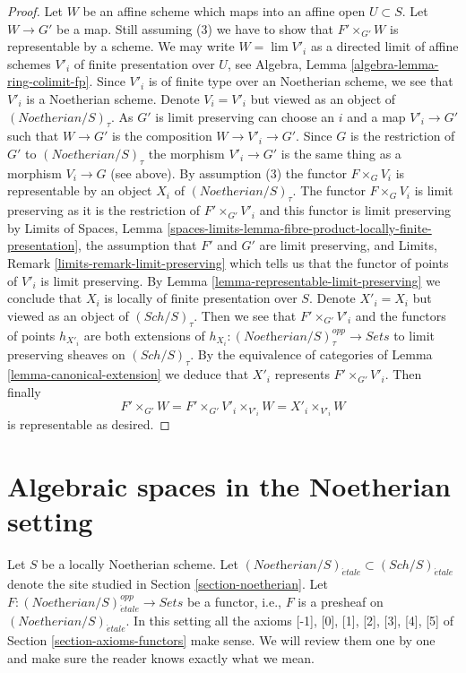 \documentclass{stacks-project}
\theoremstyle{plain}
\theoremstyle{definition}
\theoremstyle{remark}
\numberwithin{equation}{subsection}
\def\lim{\mathop{\mathrm{lim}}\nolimits}
\def\Sch{\mathit{Sch}}
\def\etale{{\acute{e}tale}}
\begin{document}
\begin{proof}
\medskip\noindent
Let $W$ be an affine scheme which maps into an affine open $U \subset S$.
Let $W \to G'$ be a map.
Still assuming (3) we have to show that $F' \times_{G'} W$
is representable by a scheme.
We may write $W = \lim V'_i$ as a directed limit of affine
schemes $V'_i$ of finite presentation over $U$, see
Algebra, Lemma \ref{algebra-lemma-ring-colimit-fp}.
Since $V'_i$ is of finite type over an Noetherian scheme,
we see that $V'_i$ is a Noetherian scheme.
Denote $V_i = V'_i$ but viewed as an object of
$(\textit{Noetherian}/S)_\tau$. As $G'$
is limit preserving can choose an $i$ and a map
$V'_i \to G'$ such that $W \to G'$ is the composition
$W \to V'_i \to G'$. Since $G$ is the restriction of $G'$
to $(\textit{Noetherian}/S)_\tau$ the morphism $V'_i \to G'$
is the same thing as a morphism $V_i \to G$ (see above).
By assumption (3) the functor $F \times_G V_i$ is representable by an object
$X_i$ of $(\textit{Noetherian}/S)_\tau$.
The functor $F \times_G V_i$ is limit preserving
as it is the restriction of $F' \times_{G'} V'_i$
and this functor is limit preserving by
Limits of Spaces, Lemma
\ref{spaces-limits-lemma-fibre-product-locally-finite-presentation},
the assumption that $F'$ and $G'$ are limit preserving, and
Limits, Remark \ref{limits-remark-limit-preserving} which
tells us that the functor of points of $V'_i$ is limit preserving.
By Lemma \ref{lemma-representable-limit-preserving}
we conclude that $X_i$ is locally of finite presentation over $S$.
Denote $X'_i = X_i$ but viewed as an object of
$(\Sch/S)_\tau$. Then we see that $F' \times_{G'} V'_i$
and the functors of points $h_{X'_i}$ are both extensions
of $h_{X_i} : (\textit{Noetherian}/S)_\tau^{opp} \to \textit{Sets}$
to limit preserving sheaves on $(\Sch/S)_\tau$.
By the equivalence of categories of Lemma \ref{lemma-canonical-extension}
we deduce that $X'_i$ represents $F' \times_{G'} V'_i$.
Then finally
$$
F' \times_{G'} W = F' \times_{G'} V'_i \times_{V'_i} W =
X'_i \times_{V'_i} W
$$
is representable as desired.
\end{proof}






\section{Algebraic spaces in the Noetherian setting}
\label{section-algebraic-spaces-noetherian}

\noindent
Let $S$ be a locally Noetherian scheme. Let
$(\textit{Noetherian}/S)_\etale \subset (\Sch/S)_\etale$
denote the site studied in Section \ref{section-noetherian}.
Let $F : (\textit{Noetherian}/S)_\etale^{opp} \to \textit{Sets}$
be a functor, i.e., $F$ is a presheaf on $(\textit{Noetherian}/S)_\etale$.
In this setting all the axioms [-1],  [0], [1], [2], [3], [4], [5] of
Section \ref{section-axioms-functors} make sense. We will review them
one by one and make sure the reader knows exactly what we mean.
\end{document}
